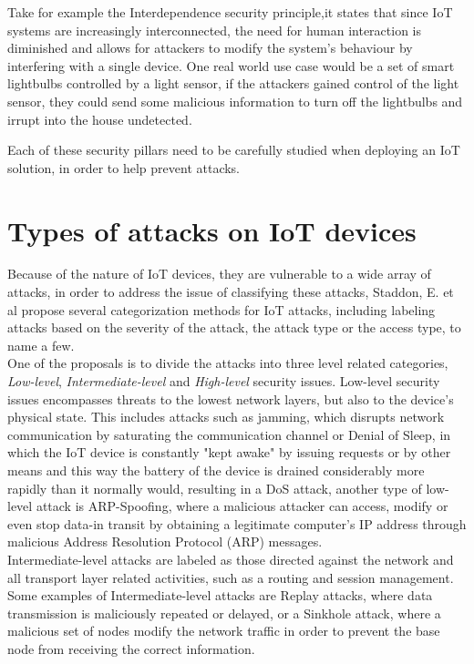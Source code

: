 Take for example the Interdependence security principle,it states that since IoT systems are increasingly interconnected, the need for human interaction is diminished and allows for attackers to modify the system's behaviour by interfering with a single device. One real world use case would be a set of smart lightbulbs controlled by a light sensor, if the attackers gained control of the light sensor, they could send some malicious information to turn off the lightbulbs and irrupt into the house undetected.

Each of these security pillars need to be carefully studied when deploying an IoT solution, in order to help prevent attacks.


\section{Types of attacks on IoT devices}
Because of the nature of IoT devices, they are vulnerable to a wide array of attacks, in order to address the issue of classifying these attacks, Staddon, E. et al \cite{IoT_categorization} propose several categorization methods for IoT attacks, including labeling attacks based on the severity of the attack, the attack type or the access type, to name a few.\\

One of the proposals is to divide the attacks into three level related categories, \emph{Low-level}, \emph{Intermediate-level} and \emph{High-level} security issues. Low-level security issues encompasses threats to the lowest network layers, but also to the device's physical state. This includes attacks such as jamming, which disrupts network communication by saturating the communication channel or Denial of Sleep, in which the IoT device is constantly "kept awake" by issuing requests or by other means and this way the battery of the device is drained considerably more rapidly than it normally would, resulting in a DoS attack, another type of low-level attack is ARP-Spoofing, where a malicious attacker can access, modify or even stop data-in transit by obtaining a legitimate computer's IP address through malicious Address Resolution Protocol (ARP) messages.\\

Intermediate-level attacks are labeled as those directed against the network and all transport layer related activities, such as a routing and session management. Some examples of Intermediate-level attacks are Replay attacks, where data transmission is maliciously repeated or delayed, or a Sinkhole attack, where a malicious set of nodes modify the network traffic in order to prevent the base node from receiving the correct information.\\

